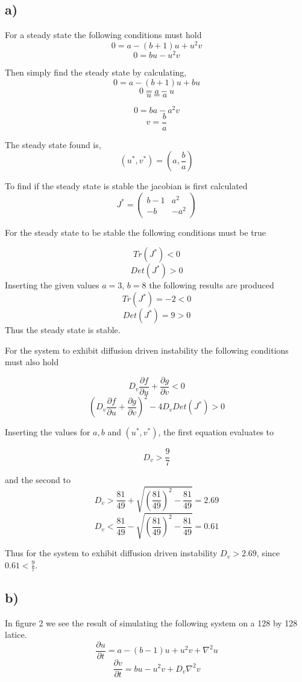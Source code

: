 \subsection*{a)}
For a steady state the following conditions must hold
$$0 = a - (b+1)u + u^2v$$
$$0 = bu - u^2v$$

Then simply find the steady state by calculating,
$$0 = a-(b+1)u +bu$$
$$0 = a - u$$
$$u = a$$

$$0 = ba - a^2v$$
$$v = \frac{b}{a}$$

The steady state found is,
$$(u^*, v^*)=\left(a,\frac{b}{a}\right)$$

To find if the steady state is stable the jacobian is first calculated
$$J^* = \left(
\begin{array}{cc}
    b-1 & a^2 \\
    -b  & -a^2
\end{array}
\right)$$

For the steady state to be stable the following conditions must be true

$$Tr(J^*) < 0$$
$$Det(J^*) > 0$$
Inserting the given values $a=3$, $b=8$ the following results are produced
$$Tr(J^*) = -2 < 0$$
$$Det(J^*) = 9 > 0$$
Thus the steady state is stable.

For the system to exhibit diffusion driven instability the following conditions must also hold

$$D_v \frac{\partial f}{\partial u} + \frac{\partial g}{\partial v} < 0$$
$$(D_v \frac{\partial f}{\partial u}+ \frac{\partial g}{\partial v})^2 - 4D_v Det(J^*) > 0$$

Inserting the values for $a, b$ and $(u^*, v^*)$, the first equation evaluates to

$$D_v > \frac{9}{7}$$

and the second to
$$D_v > \frac{81}{49} + \sqrt{\left(\frac{81}{49}\right)^2 - \frac{81}{49}} = 2.69$$
$$D_v < \frac{81}{49} - \sqrt{\left(\frac{81}{49}\right)^2 - \frac{81}{49}} = 0.61$$

Thus for the system to exhibit diffusion driven instability $D_v > 2.69$, since $0.61 < \frac{9}{7}$.


\subsection*{b)}

In figure 2 we see the result of simulating the following system on a 128 by 128 latice.
$$\frac{\partial u}{\partial t} = a - (b-1)u + u^2v + \nabla^2 u$$
$$\frac{\partial v}{\partial t} = bu - u^2v + D_v \nabla^2 v$$

